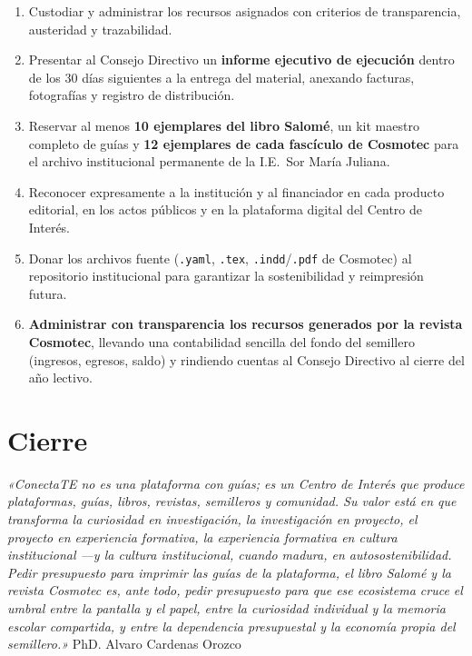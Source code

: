 \documentclass[12pt, letterpaper]{article}
\begin{document}
\begin{enumerate}[label=\textbf{\color{smjAzul}C\arabic*.}, leftmargin=*]
  \item Custodiar y administrar los recursos asignados con criterios de transparencia, austeridad y trazabilidad.
  \item Presentar al Consejo Directivo un \textbf{informe ejecutivo de ejecución} dentro de los 30 días siguientes a la entrega del material, anexando facturas, fotografías y registro de distribución.
  \item Reservar al menos \textbf{10 ejemplares del libro Salomé}, un kit maestro completo de guías y \textbf{12 ejemplares de cada fascículo de Cosmotec} para el archivo institucional permanente de la I.E.\ Sor María Juliana.
  \item Reconocer expresamente a la institución y al financiador en cada producto editorial, en los actos públicos y en la plataforma digital del Centro de Interés.
  \item Donar los archivos fuente (\texttt{.yaml}, \texttt{.tex}, \texttt{.indd}/\texttt{.pdf} de Cosmotec) al repositorio institucional para garantizar la sostenibilidad y reimpresión futura.
  \item \textbf{Administrar con transparencia los recursos generados por la revista Cosmotec}, llevando una contabilidad sencilla del fondo del semillero (ingresos, egresos, saldo) y rindiendo cuentas al Consejo Directivo al cierre del año lectivo.
\end{enumerate}

\section{Cierre}

\begin{cajaCita}
\textit{«ConectaTE no es una plataforma con guías; es un Centro de Interés que produce plataformas, guías, libros, revistas, semilleros y comunidad. Su valor está en que transforma la curiosidad en investigación, la investigación en proyecto, el proyecto en experiencia formativa, la experiencia formativa en cultura institucional —y la cultura institucional, cuando madura, en autosostenibilidad. Pedir presupuesto para imprimir las guías de la plataforma, el libro Salomé y la revista Cosmotec es, ante todo, pedir presupuesto para que ese ecosistema cruce el umbral entre la pantalla y el papel, entre la curiosidad individual y la memoria escolar compartida, y entre la dependencia presupuestal y la economía propia del semillero.»}
\hfill\textemdash{} PhD. Alvaro Cardenas Orozco
\end{cajaCita}
\end{document}
